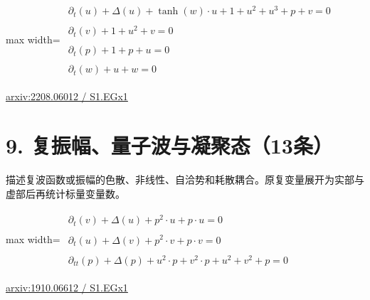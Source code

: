 \documentclass[UTF8,10pt,a4paper,fontset=mac]{ctexart}
\begin{document}
\begin{minipage}{\linewidth}\begin{center}\begin{adjustbox}{max width=\linewidth}$\displaystyle\begin{gathered}\begin{gathered}\partial_{t}(u)+\Delta(u)+\tanh(w)\cdot u+1+u^{2}+u^{3}+p+v=0\end{gathered}\\[5pt]\begin{gathered}\partial_{t}(v)+1+u^{2}+v=0\end{gathered}\\[5pt]\begin{gathered}\partial_{t}(p)+1+p+u=0\end{gathered}\\[5pt]\begin{gathered}\partial_{t}(w)+u+w=0\end{gathered}\end{gathered}$\end{adjustbox}\end{center}{\small\href{https://arxiv.org/html/2208.06012#S1.EGx1}{arxiv:2208.06012 / S1.EGx1}}\par\end{minipage}\par\vspace{6mm}

\section*{9. 复振幅、量子波与凝聚态（13条）}
描述复波函数或振幅的色散、非线性、自洽势和耗散耦合。原复变量展开为实部与虚部后再统计标量变量数。\par\medskip

\begin{minipage}{\linewidth}\begin{center}\begin{adjustbox}{max width=\linewidth}$\displaystyle\begin{gathered}\begin{gathered}\partial_{t}(v)+\Delta(u)+p^{2}\cdot u+p\cdot u=0\end{gathered}\\[5pt]\begin{gathered}\partial_{t}(u)+\Delta(v)+p^{2}\cdot v+p\cdot v=0\end{gathered}\\[5pt]\begin{gathered}\partial_{tt}(p)+\Delta(p)+u^{2}\cdot p+v^{2}\cdot p+u^{2}+v^{2}+p=0\end{gathered}\end{gathered}$\end{adjustbox}\end{center}{\small\href{https://arxiv.org/html/1910.06612#S1.EGx1}{arxiv:1910.06612 / S1.EGx1}}\par\end{minipage}\par\vspace{6mm}
\end{document}
